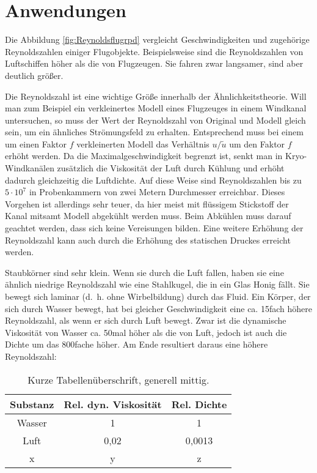 \section{Anwendungen}
\label{sec:Anwendungen}
Die Abbildung \ref{fig:Reynoldsflugrpd} vergleicht Geschwindigkeiten und zugehörige Reynoldszahlen einiger Flugobjekte. Beispielsweise sind die Reynoldszahlen von Luftschiffen höher als die von Flugzeugen. Sie fahren zwar langsamer, sind aber deutlich größer.\par
Die Reynoldszahl ist eine wichtige Größe innerhalb der Ähnlichkeitstheorie. Will man zum Beispiel ein verkleinertes Modell eines Flugzeuges in einem Windkanal untersuchen, so muss der Wert der Reynoldszahl von Original und Modell gleich sein, um ein ähnliches Strömungsfeld zu erhalten. Entsprechend muss bei einem um einen Faktor $f$ verkleinerten Modell das Verhältnis $u/\widetilde{u} $ um den Faktor $f$ erhöht werden. Da die Maximalgeschwindigkeit begrenzt ist, senkt man in Kryo-Windkanälen zusätzlich die Viskosität der Luft durch Kühlung und erhöht dadurch gleichzeitig die Luftdichte. Auf diese Weise sind Reynoldszahlen bis zu $5\cdot10^7$ in Probenkammern von zwei Metern Durchmesser erreichbar. Dieses Vorgehen ist allerdings sehr teuer, da hier meist mit flüssigem Stickstoff der Kanal mitsamt Modell abgekühlt werden muss. Beim Abkühlen muss darauf geachtet werden, dass sich keine Vereisungen bilden. Eine weitere Erhöhung der Reynoldszahl kann auch durch die Erhöhung des statischen Druckes erreicht werden. 
\par
Staubkörner sind sehr klein. Wenn sie durch die Luft fallen, haben sie eine ähnlich niedrige Reynoldszahl wie eine Stahlkugel, die in ein Glas Honig fällt. Sie bewegt sich laminar (d. h. ohne Wirbelbildung) durch das Fluid. Ein Körper, der sich durch Wasser bewegt, hat bei gleicher Geschwindigkeit eine ca. 15fach höhere Reynoldszahl, als wenn er sich durch Luft bewegt. Zwar ist die dynamische Viskosität von Wasser ca. 50mal höher als die von Luft, jedoch ist auch die Dichte um das 800fache höher. 
Am Ende resultiert daraus eine höhere Reynoldszahl:
\begin{table}[htbp]
\caption{Kurze Tabellenüberschrift, generell mittig.}
	\label{tab:xyz}
	\centering
	\footnotesize
	\sffamily
		\begin{tabular}{|c||c|c|}
			\hline
			Substanz & Rel. dyn. Viskosität & Rel. Dichte \\ \hline\hline
			 Wasser  &          1           &      1      \\ \hline
			  Luft   &         0,02         &   0,0013    \\ \hline
			   x     &          y           &      z      \\ \hline
		\end{tabular}
\end{table}
